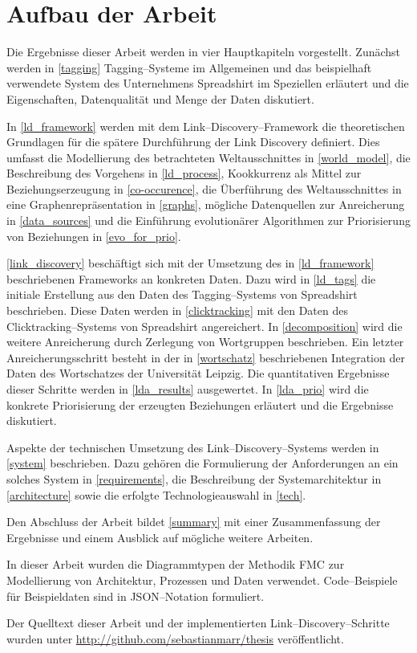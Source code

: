 \section{Aufbau der Arbeit}

Die Ergebnisse dieser Arbeit werden in vier Hauptkapiteln vorgestellt. Zunächst werden in \cref{tagging} Tagging--Systeme im Allgemeinen und das beispielhaft verwendete System des Unternehmens Spreadshirt im Speziellen erläutert und die Eigenschaften, Datenqualität und Menge der Daten diskutiert.

In \cref{ld_framework} werden mit dem Link--Discovery--Framework die theoretischen Grundlagen für die spätere Durchführung der Link Discovery definiert. Dies umfasst die Modellierung des betrachteten Weltausschnittes in \cref{world_model}, die Beschreibung des Vorgehens in \cref{ld_process}, Kookkurrenz als Mittel zur Beziehungserzeugung in \cref{co-occurence}, die Überführung des Weltausschnittes in eine Graphenrepräsentation in \cref{graphs}, mögliche Datenquellen zur Anreicherung in \cref{data_sources} und die Einführung evolutionärer Algorithmen zur Priorisierung von Beziehungen in \cref{evo_for_prio}.

\cref{link_discovery} beschäftigt sich mit der Umsetzung des in \cref{ld_framework} beschriebenen Frameworks an konkreten Daten. Dazu wird in \cref{ld_tags} die initiale Erstellung aus den Daten des Tagging--Systems von Spreadshirt beschrieben. Diese Daten werden in \cref{clicktracking} mit den Daten des Clicktracking--Systems von Spreadshirt angereichert. In \cref{decomposition} wird die weitere Anreicherung durch Zerlegung von Wortgruppen beschrieben. Ein letzter Anreicherungsschritt besteht in der in \cref{wortschatz} beschriebenen Integration der Daten des Wortschatzes der Universität Leipzig. Die quantitativen Ergebnisse dieser Schritte werden in \cref{lda_results} ausgewertet. In \cref{lda_prio} wird die konkrete Priorisierung der erzeugten Beziehungen erläutert und die Ergebnisse diskutiert.

Aspekte der technischen Umsetzung des Link--Discovery--Systems werden in \cref{system} beschrieben. Dazu gehören die Formulierung der Anforderungen an ein solches System in \cref{requirements}, die Beschreibung der Systemarchitektur in \cref{architecture} sowie die erfolgte Technologieauswahl in \cref{tech}.

Den Abschluss der Arbeit bildet \cref{summary} mit einer Zusammenfassung der Ergebnisse und einem Ausblick auf mögliche weitere Arbeiten.

In dieser Arbeit wurden die Diagrammtypen der Methodik FMC \cite{fmc} zur Modellierung von Architektur, Prozessen und Daten verwendet. Code--Beispiele für Beispieldaten sind in JSON--Notation \cite{json2006} formuliert.

Der Quelltext dieser Arbeit und der implementierten Link--Discovery--Schritte wurden unter \url{http://github.com/sebastianmarr/thesis} veröffentlicht.
